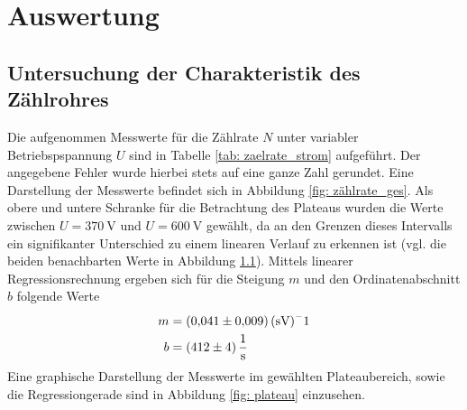 \section{Auswertung}


\subsection{Untersuchung der Charakteristik des Zählrohres}
Die aufgenommen Messwerte für die Zählrate $N$ unter variabler Betriebspspannung $U$ sind
in Tabelle \ref{tab: zaelrate_strom} aufgeführt. Der angegebene Fehler wurde hierbei stets
auf eine ganze Zahl gerundet. Eine Darstellung der Messwerte befindet sich in Abbildung \ref{fig: zählrate_ges}.
Als obere und untere Schranke für die Betrachtung des Plateaus wurden die Werte zwischen $U = \SI{370}{\volt}$
und $U = \SI{600}{\volt}$ gewählt, da an den Grenzen dieses Intervalls ein signifikanter Unterschied zu einem
linearen Verlauf zu erkennen ist (vgl. die beiden benachbarten Werte in Abbildung \ref{}). Mittels linearer %
Regressionsrechnung ergeben sich für die Steigung $m$ und den Ordinatenabschnitt $b$ folgende Werte
\begin{align}
  m &= \SI{0.041 \pm 0.009}{(\second\volt)^-1} \\
  b &= \SI{412 \pm 4}{\per\second}
\end{align}%
Eine graphische Darstellung der Messwerte im gewählten Plateaubereich, sowie die Regressiongerade sind in
Abbildung \ref{fig: plateau} einzusehen.

